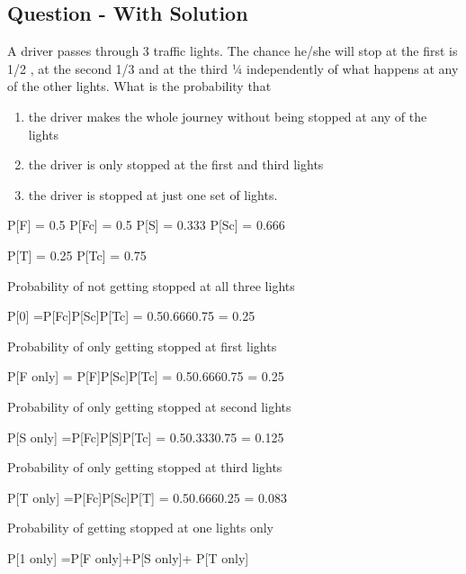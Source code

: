 






\subsection{Question - With Solution}


A driver passes through 3 traffic lights. The chance he/she will stop at the first is 1/2 , at the second 1/3 and at the third ¼ independently of what happens at any of the other lights. What is the probability that

\begin{enumerate}
\item    the driver makes the whole journey without being stopped at any of the lights

\item   the driver is only stopped at the first and third lights

\item  the driver is stopped at just one set of lights.
\end{enumerate}

P[F] = 0.5           P[Fc] = 0.5            P[S] = 0.333        P[Sc] = 0.666

P[T] = 0.25         P[Tc] = 0.75





Probability of not getting stopped at all three lights


P[0] =P[Fc]P[Sc]P[Tc] = 0.50.6660.75 = 0.25



Probability of only getting stopped at first  lights


P[F only] = P[F]P[Sc]P[Tc] = 0.50.6660.75 = 0.25


Probability of only getting stopped at second lights


P[S only] =P[Fc]P[S]P[Tc] = 0.50.3330.75 = 0.125








Probability of only getting stopped at third  lights

P[T only] =P[Fc]P[Sc]P[T] = 0.50.6660.25 = 0.083


Probability of getting stopped at one lights only 


P[1 only] =P[F only]+P[S only]+ P[T only]


